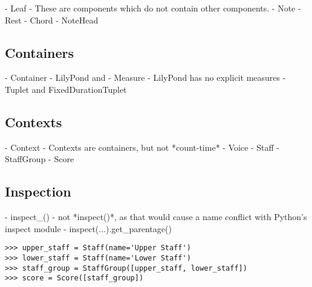 \begin{markdown}
-   Leaf
-   These are components which do not contain other components.
-   Note
-   Rest
-   Chord
-   NoteHead
\end{markdown}

\subsection{Containers}

\begin{markdown}
-   Container
-   LilyPond and { }
-   Measure
-   LilyPond has no explicit measures
-   Tuplet and FixedDurationTuplet
\end{markdown}

\subsection{Contexts}

\begin{markdown}
-   Context
-   Contexts are containers, but not *count-time*
-   Voice
-   Staff
-   StaffGroup
-   Score
\end{markdown}

\subsection{Inspection}

\begin{markdown}
-   inspect_()
-   not *inspect()*, as that would cause a name conflict with Python's inspect
    module
-   inspect(...).get_parentage()
\end{markdown}

\begin{comment}
<abjad>
upper_staff = Staff(name='Upper Staff')
lower_staff = Staff(name='Lower Staff')
staff_group = StaffGroup([upper_staff, lower_staff])
score = Score([staff_group])
</abjad>
\end{comment}

\begin{abjadbookoutput}
\begin{singlespacing}
\vspace{-0.5\baselineskip}
\begin{lstlisting}
>>> upper_staff = Staff(name='Upper Staff')
>>> lower_staff = Staff(name='Lower Staff')
>>> staff_group = StaffGroup([upper_staff, lower_staff])
>>> score = Score([staff_group])
\end{lstlisting}
\end{singlespacing}
\end{abjadbookoutput}

